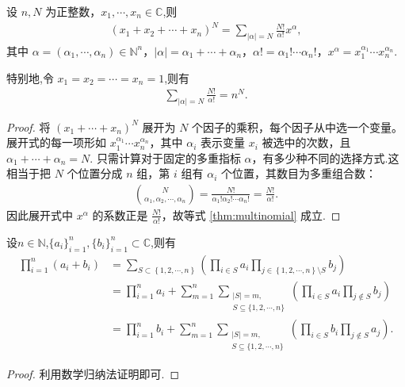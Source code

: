 \documentclass[../../main.tex]{subfiles}%
\begin{document}
\begin{theorem}[二项式定理]\label{theorem:组合公式-二项式定理}
设 $n,N$ 为正整数，$x_1,\cdots,x_n\in \mathbb{C}$,则
\begin{align}
(x_1+x_2+\cdots+x_n)^N=\sum_{|\alpha|=N}\frac{N!}{\alpha!}x^\alpha, \label{thm:multinomial}
\end{align}
其中 $\alpha=(\alpha_1,\cdots,\alpha_n)\in\mathbb{N}^n$，$|\alpha|=\alpha_1+\cdots+\alpha_n$，$\alpha!=\alpha_1!\cdots\alpha_n!$，$x^\alpha=x_1^{\alpha_1}\cdots x_n^{\alpha_n}$.

特别地,令 $x_1=x_2=\cdots=x_n=1$,则有
\begin{align*}
\sum_{|\alpha|=N}\frac{N!}{\alpha!}=n^N. 
\end{align*}
\end{theorem}
\begin{proof}
将 $(x_1+\cdots+x_n)^N$ 展开为 $N$ 个因子的乘积，每个因子从中选一个变量。展开式的每一项形如 $x_1^{\alpha_1}\cdots x_n^{\alpha_n}$，其中 $\alpha_i$ 表示变量 $x_i$ 被选中的次数，且 $\alpha_1+\cdots+\alpha_n=N$. 只需计算对于固定的多重指标 $\alpha$，有多少种不同的选择方式.这相当于把 $N$ 个位置分成 $n$ 组，第 $i$ 组有 $\alpha_i$ 个位置，其数目为多重组合数：
\begin{align*}
\binom{N}{\alpha_1,\alpha_2,\cdots,\alpha_n}=\frac{N!}{\alpha_1!\alpha_2!\cdots\alpha_n!}=\frac{N!}{\alpha!}.
\end{align*}
因此展开式中 $x^\alpha$ 的系数正是 $\frac{N!}{\alpha!}$，故等式 \eqref{thm:multinomial} 成立.
\end{proof}

\begin{theorem}[二项式定理的推广]\label{theorem:二项式定理的推广}
设$n\in \mathbb{N}$,$\{a_i\}_{i=1}^{n},\{b_i\}_{i=1}^{n}\subset \mathbb{C}$,则有
\begin{align*}
\prod_{i=1}^n{\left( a_i+b_i \right)}&=\sum_{S\subset \left\{ 1,2,\cdots ,n \right\}}{\left( \prod_{i\in S}{a_i\prod_{j\in \left\{ 1,2,\cdots ,n \right\} \setminus S}{b_j}} \right)}
\\
&=\prod_{i=1}^n{a_i}+\sum_{m=1}^n{\sum\limits_{\substack{|S|=m, \\ S \subseteq \{1,2,\cdots,n\}}}{\left( \prod_{i\in S}{a_i}\prod_{j\notin S}{b_j} \right)}}
\\
&=\prod_{i=1}^n{b_i}+\sum_{m=1}^n{\sum\limits_{\substack{|S|=m, \\ S \subseteq \{1,2,\cdots,n\}}}{\left( \prod_{i\in S}{b_i}\prod_{j\notin S}{a_j} \right)}}.
\end{align*}
\end{theorem}
\begin{proof}
利用数学归纳法证明即可.
\end{proof}
\end{document}
